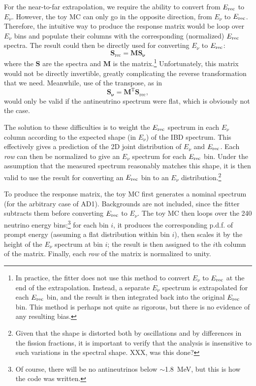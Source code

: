 \documentclass[../thesis.tex]{subfiles}
\begin{document}
For the near-to-far extrapolation, we require the ability to convert from $E_\mathrm{rec}$ to $E_\nu$. However, the toy MC can only go in the opposite direction, from $E_\nu$ to $E_\mathrm{rec}$. Therefore, the intuitive way to produce the response matrix would be loop over $E_\nu$ bins and populate their columns with the corresponding (normalized) $E_\mathrm{rec}$ spectra. The result could then be directly used for converting $E_\nu$ to $E_\mathrm{rec}$:
\begin{equation*}
  \mathbf{S_{\mathrm{rec}}} = \mathbf{M} \mathbf{S_\nu} 
\end{equation*}
where the $\mathbf{S}$ are the spectra and $\mathbf{M}$ is the matrix.\footnote{\label{foot:fitEnuToErec}In practice, the fitter does not use this method to convert $E_\nu$ to $E_\mathrm{rec}$ at the end of the extrapolation. Instead, a separate $E_\nu$ spectrum is extrapolated for each $E_\mathrm{rec}$ bin, and the result is then integrated back into the original $E_\mathrm{rec}$ bin. This method is perhaps not quite as rigorous, but there is no evidence of any resulting bias.} Unfortunately, this matrix would not be directly invertible, greatly complicating the reverse transformation that we need. Meanwhile, use of the transpose, as in
\begin{equation*}
  \mathbf{S_\nu} = \mathbf{M^{\mathrm{T}}} \mathbf{S_{\mathrm{rec}}},
\end{equation*}
would only be valid if the antineutrino spectrum were flat, which is obviously not the case.

The solution to these difficulties is to weight the $E_\mathrm{rec}$ spectrum in each $E_\nu$ column according to the expected shape (in $E_\nu$) of the IBD spectrum. This effectively gives a prediction of the 2D joint distribution of $E_\nu$ and $E_\mathrm{rec}$. Each \emph{row} can then be normalized to give an $E_\nu$ spectrum for each $E_\mathrm{rec}$ bin. Under the assumption that the measured spectrum reasonably matches this shape, it is then valid to use the result for converting an $E_\mathrm{rec}$ bin to an $E_\nu$ distribution.\footnote{Given that the shape is distorted both by oscillations and by differences in the fission fractions, it is important to verify that the analysis is insensitive to such variations in the spectral shape. XXX, was this done?}

\begin{comment}
  We should fix genEvisToEnuMatrix.C to turn off the theta13 oscillation, and then note below that oscillations are disabled.
\end{comment}

To produce the response matrix, the toy MC first generates a nominal spectrum (for the arbitrary case of AD1). Backgrounds are not included, since the fitter subtracts them before converting $E_\mathrm{rec}$ to $E_\nu$. The toy MC then loops over the 240 neutrino energy bins;\footnote{Of course, there will be no antineutrinos below $\sim$1.8~MeV, but this is how the code was written.} for each bin $i$, it produces the corresponding p.d.f. of prompt energy (assuming a flat distribution within bin $i$), then scales it by the height of the $E_\nu$ spectrum at bin $i$; the result is then assigned to the $i$th column of the matrix. Finally, each \emph{row} of the matrix is normalized to unity.
\end{document}
